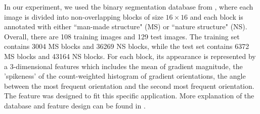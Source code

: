 In our experiment, we used the binary segmentation database from \cite{img_seg_database}, where each image is divided into non-overlapping blocks of 
size $16\times16$ and each block is annotated with either ``man-made structure" (MS) or ``nature structure" (NS). 
Overall, there are 108 training images and 129 test images. The training set contains 3004 MS blocks and 36269 NS blocks, while the test set 
contains 6372 MS blocks and 43164 NS blocks.
For each block, its appearance is 
represented by a 3-dimensional features which includes the mean of gradient magnitude, the 'spikeness' of the count-weighted histogram of gradient orientations, 
the angle between the most frequent orientation and the second most frequent orientation. The feature was designed to fit this specific application.        
More explanation of the database and feature design can be found in \cite{img_seg_database}. 


